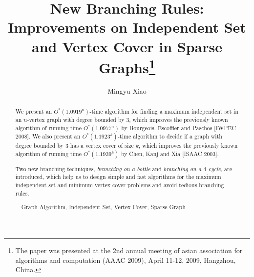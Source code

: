 \documentclass[runningheads]{llncs}
\begin{document}
\title{New Branching Rules: Improvements on Independent Set and Vertex Cover in Sparse Graphs\footnote{The paper was presented at the 2nd
annual meeting of asian association for algorithms and computation
(AAAC 2009), April 11-12, 2009, Hangzhou, China.}}


\author{Mingyu Xiao}
\authorrunning{}






 \tocauthor{} \maketitle


\begin{abstract}
We present an $O^*(1.0919^n)$-time algorithm for finding a maximum
independent set in an $n$-vertex graph with degree bounded by $3$,
which improves the previously known algorithm of running time
$O^*(1.0977^n)$ by Bourgeois, Escoffier and Paschos [IWPEC 2008].
We also present an $O^*(1.1923^k)$-time algorithm to decide if a
graph with degree bounded by $3$ has a vertex cover of size $k$,
which improves the previously known algorithm of running time
$O^*(1.1939^k)$ by Chen, Kanj and Xia [ISAAC 2003].

Two new branching techniques, \emph{branching on a bottle} and
\emph{branching on a $4$-cycle}, are introduced, which help us to
design simple and fast algorithms for the maximum independent set
and minimum vertex cover problems and avoid tedious branching
rules.


\vspace{5mm} \ \ Graph Algorithm,
Independent Set, Vertex Cover, Sparse Graph
\end{abstract}
\end{document}

